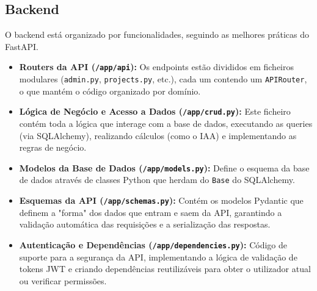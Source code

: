 \subsection{Backend}

O backend está organizado por funcionalidades, seguindo as melhores práticas do FastAPI.

\begin{itemize}
    \item \textbf{Routers da API (\texttt{/app/api}):} Os endpoints estão divididos em ficheiros modulares (\texttt{admin.py}, \texttt{projects.py}, etc.), cada um contendo um \texttt{APIRouter}, o que mantém o código organizado por domínio.
    \item \textbf{Lógica de Negócio e Acesso a Dados (\texttt{/app/crud.py}):} Este ficheiro contém toda a lógica que interage com a base de dados, executando as queries (via SQLAlchemy), realizando cálculos (como o IAA) e implementando as regras de negócio.
    \item \textbf{Modelos da Base de Dados (\texttt{/app/models.py}):} Define o esquema da base de dados através de classes Python que herdam do \texttt{Base} do SQLAlchemy.
    \item \textbf{Esquemas da API (\texttt{/app/schemas.py}):} Contém os modelos Pydantic que definem a "forma" dos dados que entram e saem da API, garantindo a validação automática das requisições e a serialização das respostas.
    \item \textbf{Autenticação e Dependências (\texttt{/app/dependencies.py}):} Código de suporte para a segurança da API, implementando a lógica de validação de tokens JWT e criando dependências reutilizáveis para obter o utilizador atual ou verificar permissões.
\end{itemize}